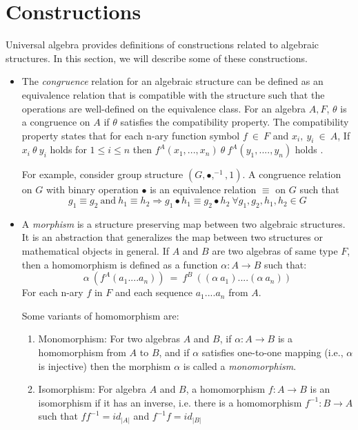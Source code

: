 \section{Constructions}
Universal algebra provides definitions of constructions related to algebraic
structures. In this section, we will describe some of these constructions. 
\begin{itemize}
    \item The \textit{congruence} relation for an algebraic structure can be
    defined as an equivalence relation that is compatible with the structure
    such that the operations are well-defined on the equivalence class. For an
    algebra $A,F$, $\theta$ is a congruence on $A$ if $\theta$ satisfies the
    compatibility property. The compatibility property states that for each
    n-ary function symbol $f \ \in\ F$ and $x_i,\ y_i\ \in\ A$, If $x_i\ \theta\
    y_i$ holds for \(1\leq i \leq n\) then $f^{A}(x_1,...,x_n)\ \theta\
    f^{A}(y_1,....,y_n)$ holds \cite{sankappanavar1981course}.

    For example, consider group structure $(G, ∙, ^{-1}, 1)$. A
    congruence relation on $G$ with binary operation $∙$ is an equivalence
    relation $\equiv$ on $G$ such that \[g_1\equiv g_2\ \text{and}\ h_1 \equiv h_2
    \Rightarrow g_1 ∙ h_1 \equiv g_2 ∙ h_2\ \forall g_1,g_2,h_1,h_2 \in G\] 

    \item A \textit{morphism} is a structure preserving map between two
    algebraic structures. It is an abstraction that generalizes the map between
    two structures or mathematical objects in general. If $A$ and $B$ are two
    algebras of same type $F$, then a homomorphism is defined as a function
    $\alpha: A \rightarrow B$ such that: \[ \alpha\ (f^{A}(a_1....a_n))\ =\
    f^{B}\ ((\alpha\ a_1)....(\alpha\ a_n))\] For each n-ary $f$ in $F$ and
    each sequence $a_1....a_n$ from $A$.

    Some variants of homomorphism are:
    \begin{enumerate}
        \item  Monomorphism: For two algebras $A$ and $B$, if \(\alpha : A
        \rightarrow B \) is a homomorphism from $A$ to $B$, and if \(\alpha\)
        satisfies one-to-one mapping (i.e., \(\alpha\) is injective) then the
        morphism \(\alpha\) is called a \textit{monomorphism}.

        \item Isomorphism: For algebra $A$ and $B$, a homomorphism $f:A → B$ is
        an isomorphism if it has an inverse, i.e. there is a homomorphism
        $f^{-1}:B → A$ such that $ff^{-1} =
        id_{|A|}$ and $f^{-1}f = id_{|B|}$ 


\end{enumerate}
\end{itemize}
